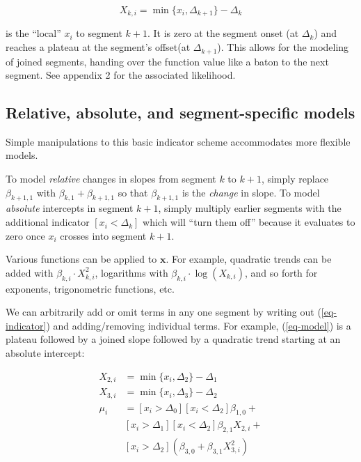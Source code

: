 \documentclass[
  american,
]{article}
\begin{document}
\begin{equation}
\label{eq-localx}
X_{k,i} = \min\{x_i, \Delta_{k+1}\} - \Delta_{k}
\end{equation}

is the ``local'' \(x_i\) to segment \(k + 1\). It is zero at the segment onset (at \(\Delta_k\)) and reaches a plateau at the segment's offset(at \(\Delta_{k+1}\)). This allows for the modeling of joined segments, handing over the function value like a baton to the next segment. See appendix 2 for the associated likelihood.

\hypertarget{relative-absolute-and-segment-specific-models}{%
\subsection{Relative, absolute, and segment-specific models}\label{relative-absolute-and-segment-specific-models}}

Simple manipulations to this basic indicator scheme accommodates more flexible models.

To model \emph{relative} changes in slopes from segment \(k\) to \(k+1\), simply replace \(\beta_{k+1, 1}\) with \(\beta_{k, 1} + \beta_{k + 1, 1}\) so that \(\beta_{k + 1, 1}\) is the \emph{change} in slope. To model \emph{absolute} intercepts in segment \(k + 1\), simply multiply earlier segments with the additional indicator \([x_i < \Delta_k]\) which will ``turn them off'' because it evaluates to zero once \(x_i\) crosses into segment \(k + 1\).

Various functions can be applied to \(\mathbf{x}\). For example, quadratic trends can be added with \(\beta_{k, i} \cdot X_{k,i}^2\), logarithms with \(\beta_{k, i} \cdot \log(X_{k,i})\), and so forth for exponents, trigonometric functions, etc.

We can arbitrarily add or omit terms in any one segment by writing out (\ref{eq-indicator}) and adding/removing individual terms. For example, (\ref{eq-model}) is a plateau followed by a joined slope followed by a quadratic trend starting at an absolute intercept:

\begin{equation}
\label{eq-model}
\begin{aligned}
X_{2, i} & = \min\{x_i, \Delta_2\} - \Delta_1 \\
X_{3, i} & = \min\{x_i, \Delta_3\} - \Delta_2 \\
\mu_i & =  [x_i > \Delta_0] [x_i < \Delta_2] \beta_{1, 0} + \\
         & [x_i > \Delta_1] [x_i < \Delta_2] \beta_{2, 1} X_{2, i} + \\
         & [x_i > \Delta_2] (\beta_{3, 0} + \beta_{3, 1} X_{3, i}^2)
\end{aligned}
\end{equation}
\end{document}
